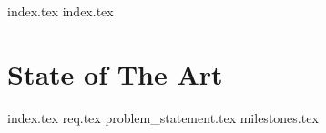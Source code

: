 {index.tex}
{index.tex}
\chapter{State of The Art}\label{cha:sota}
{index.tex}
{req.tex}
{problem_statement.tex}
{milestones.tex}
